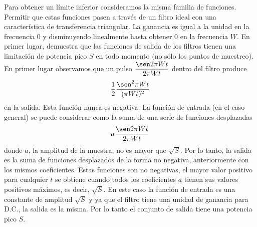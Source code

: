 Para obtener un l\'imite inferior consideramos la misma familia de
funciones. Permitir que estas funciones pasen a trav\'es de un filtro
ideal con una caracter\'istica de transferencia triangular. La
ganancia es igual a la unidad en la frecuencia 0 y disminuyendo
linealmente hasta obtener 0 en la frecuencia $W$. En primer lugar,
demuestra que las funciones de salida de los filtros tienen una
limitaci\'on de potencia pico $S$ en todo momento (no s\'olo los
puntos de muestreo). En primer lugar observamos que un pulso
$\dfrac{\sen 2 \pi Wt}{2 \pi Wt}$ dentro del filtro produce
\begin{equation}
  \dfrac{1}{2} \dfrac{\sen^2 \pi Wt}{(\pi Wt)^2}
\end{equation}
en la salida. Esta funci\'on nunca es negativa. La funci\'on de
entrada (en el caso general) se puede considerar como la suma de una
serie de funciones desplazadas
\begin{equation}
  a \dfrac{\sen 2 \pi Wt}{2 \pi Wt}
\end{equation}
donde $a$, la amplitud de la muestra, no es mayor que $\sqrt{S}$. Por
lo tanto, la salida es la suma de funciones desplazados de la forma
no negativa, anteriormente con los mismos coeficientes. Estas
funciones son no negativas, el mayor valor positivo para cualquier
$t$ se obtiene cuando todos los coeficientes $a$ tienen sus valores
positivos m\'aximos, es decir, $\sqrt{S}$. En este caso la funci\'on
de entrada es una constante de amplitud $\sqrt{S}$ y ya que el filtro
tiene una unidad de ganancia para D.C., la salida es la misma. Por lo
tanto el conjunto de salida tiene una potencia pico $S$.

